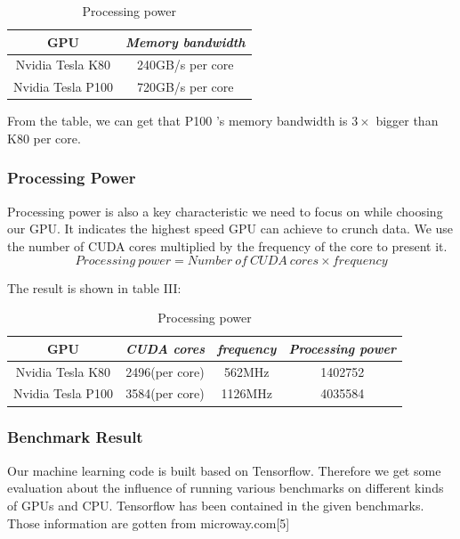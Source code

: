 \documentclass[conference]{IEEEtran}
\begin{document}
\begin{table}[H]
\caption{Processing power}
\begin{center}
\begin{tabular}{|c|c|}
\hline
\textbf{GPU} & \textbf{\textit{Memory bandwidth}}\\
\hline
Nvidia Tesla K80 & 240GB/s per core \\
\hline
Nvidia Tesla P100 & 720GB/s per core\\
\hline
\end{tabular}
\end{center}
\end{table}


From the table, we can get that P100 's memory bandwidth is $3 \times$ bigger than K80 per core. 

\subsubsection{Processing Power}
Processing power is also a key characteristic we need to focus on while choosing our GPU. It indicates the highest speed GPU can achieve to crunch data. We use the number of CUDA cores multiplied by the frequency of the core to present it.
$$Processing \ power = Number \ of \ CUDA \ cores \times frequency $$

The result is shown in table III:

\begin{table}[H]
\caption{Processing power}
\begin{center}
\begin{tabular}{|c|c|c|c|}
\hline
\textbf{GPU} & \textbf{\textit{CUDA cores}}& \textbf{\textit{frequency}}& \textbf{\textit{Processing power}} \\
\hline
Nvidia Tesla K80 & 2496(per core)& 562MHz & 1402752 \\
\hline
Nvidia Tesla P100 & 3584(per core)& 1126MHz & 4035584 \\
\hline
\end{tabular}
\label{tab2}
\end{center}
\end{table}

\subsubsection{Benchmark Result}

Our machine learning code is built based on Tensorflow. Therefore we get some evaluation about the influence of running various benchmarks on different kinds of GPUs and CPU. Tensorflow has been contained in the given benchmarks. Those information are gotten from microway.com[5]
\end{document}
